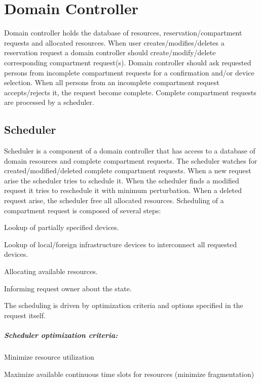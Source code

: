 \chapter{Domain Controller}

Domain controller holds the database of resources, reservation/compartment 
requests and allocated resources. When user creates/modifies/deletes a 
reservation request a domain controller should create/modify/delete 
corresponding compartment request(s). Domain controller should ask requested 
persons from incomplete compartment requests for a confirmation and/or device 
selection. When all persons from an incomplete compartment request 
accepts/rejects it, the request become complete. Complete compartment requests 
are processed by a scheduler.

\section{Scheduler}

Scheduler is a component of a domain controller that has access to a database 
of domain resources and complete compartment requests. The scheduler watches for
created/modified/deleted complete compartment requests. When a new request arise
the scheduler tries to schedule it. When the scheduler finds a modified request
it tries to reschedule it with minimum perturbation. When 
a deleted request arise, the scheduler free all allocated resources. Scheduling of a compartment request is composed of several steps:
\begin{compactenum}
\item Lookup of partially specified devices.
\item Lookup of local/foreign infrastructure devices to interconnect all requested devices.
\item Allocating available resources.
\item Informing request owner about the state.
\end{compactenum}
The scheduling is driven by optimization criteria and options specified in the request itself.


\paragraph{Scheduler optimization criteria:}
\begin{compactitem}
\item Minimize resource utilization
\item Maximize available continuous time slots for resources (minimize 
  fragmentation)
\end{compactitem}

